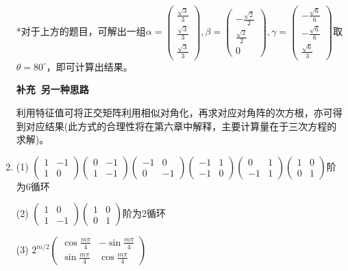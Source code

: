 \documentclass[a4paper,UTF8,fontset=windows]{ctexart}
\begin{document}
\begin{enumerate}
*对于上方的题目，可解出一组$\alpha=\begin{pmatrix}\frac{\sqrt3}{3}\\[1.5ex]\frac{\sqrt3}{3}\\[1.5ex]\frac{\sqrt3}{3}\end{pmatrix},\beta=\begin{pmatrix}-\frac{\sqrt2}{2}\\[1.5ex]\frac{\sqrt2}{2}\\[1.5ex]0\end{pmatrix},\gamma=\begin{pmatrix}-\frac{\sqrt6}{6}\\[1.5ex]-\frac{\sqrt6}{6}\\[1.5ex]\frac{\sqrt6}{3}\end{pmatrix}$取$\theta=80^\circ$，即可计算出结果。

\textbf{补充\ 另一种思路}

利用特征值可将正交矩阵利用相似对角化，再求对应对角阵的次方根，亦可得到对应结果(此方式的合理性将在第六章中解释，主要计算量在于三次方程的求解)。

\item
(1) $\begin{pmatrix}1&-1\\1&0\end{pmatrix}\begin{pmatrix}0&-1\\1&-1\end{pmatrix}\begin{pmatrix}-1&0\\0&-1\end{pmatrix}\begin{pmatrix}-1&1\\-1&0\end{pmatrix}\begin{pmatrix}0&1\\-1&1\end{pmatrix}\begin{pmatrix}1&0\\0&1\end{pmatrix}$阶为6循环

(2) $\begin{pmatrix}1&0\\1&-1\end{pmatrix}\begin{pmatrix}1&0\\0&1\end{pmatrix}$阶为2循环

(3) $2^{m/2}\begin{pmatrix}\cos{\frac{m\pi}{4}}&-\sin{\frac{m\pi}{4}}\\[1.5ex]\sin{\frac{m\pi}{4}}&\cos{\frac{m\pi}{4}}\end{pmatrix}$


\end{enumerate}
\end{document}
